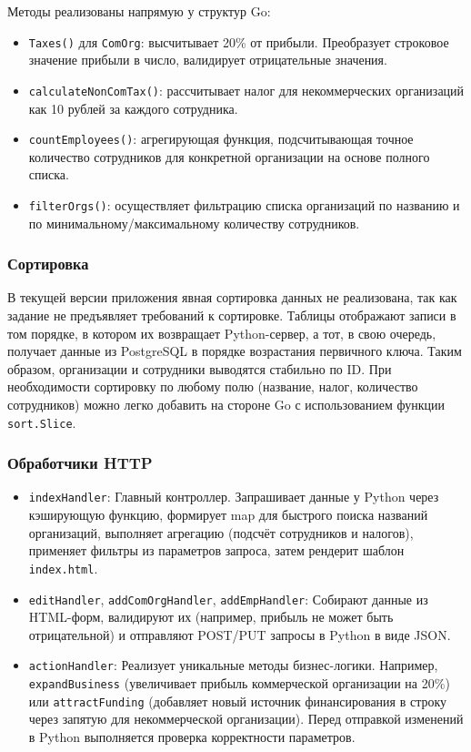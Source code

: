 \documentclass[oneside,a4paper,14pt]{extarticle}
\begin{document}
Методы реализованы напрямую у структур Go:
\begin{itemize}
    \item \texttt{Taxes()} для \texttt{ComOrg}: высчитывает 20\% от прибыли. Преобразует строковое значение прибыли в число, валидирует отрицательные значения.
    \item \texttt{calculateNonComTax()}: рассчитывает налог для некоммерческих организаций как 10 рублей за каждого сотрудника.
    \item \texttt{countEmployees()}: агрегирующая функция, подсчитывающая точное количество сотрудников для конкретной организации на основе полного списка.
    \item \texttt{filterOrgs()}: осуществляет фильтрацию списка организаций по названию и по минимальному/максимальному количеству сотрудников.
\end{itemize}

\subsubsection*{Сортировка}

В текущей версии приложения явная сортировка данных не реализована, так как задание не предъявляет требований к сортировке. Таблицы отображают записи в том порядке, в котором их возвращает Python-сервер, а тот, в свою очередь, получает данные из PostgreSQL в порядке возрастания первичного ключа. Таким образом, организации и сотрудники выводятся стабильно по ID. При необходимости сортировку по любому полю (название, налог, количество сотрудников) можно легко добавить на стороне Go с использованием функции \texttt{sort.Slice}.

\subsubsection*{Обработчики HTTP}

\begin{itemize}
    \item \texttt{indexHandler}: Главный контроллер. Запрашивает данные у Python через кэширующую функцию, формирует map для быстрого поиска названий организаций, выполняет агрегацию (подсчёт сотрудников и налогов), применяет фильтры из параметров запроса, затем рендерит шаблон \texttt{index.html}.
    \item \texttt{editHandler}, \texttt{addComOrgHandler}, \texttt{addEmpHandler}: Собирают данные из HTML-форм, валидируют их (например, прибыль не может быть отрицательной) и отправляют POST/PUT запросы в Python в виде JSON.
    \item \texttt{actionHandler}: Реализует уникальные методы бизнес-логики. Например, \texttt{expandBusiness} (увеличивает прибыль коммерческой организации на 20\%) или \texttt{attractFunding} (добавляет новый источник финансирования в строку через запятую для некоммерческой организации). Перед отправкой изменений в Python выполняется проверка корректности параметров.
\end{itemize}
\end{document}
